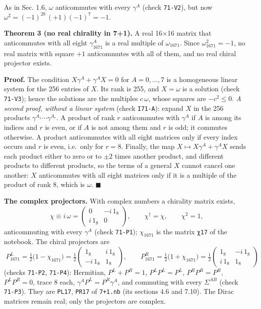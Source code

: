 \documentclass[
  10pt,
]{article}
\begin{document}
As in Sec. 1.6, \(\omega\) anticommutes with every \(\gamma^A\) (check
\texttt{71-V2}), but now \(\omega^2=(-1)^{28}\,(+1)(-1)^7=-1\).

\textbf{Theorem 3 (no real chirality in 7+1).} A real 16×16 matrix that
anticommutes with all eight \(\gamma_{1671}^A\) is a real multiple of
\(\omega_{1671}\). Since \(\omega_{1671}^2=-1\), no real matrix with
square \(+1\) anticommutes with all of them, and no real chiral
projector exists.

\textbf{Proof.} The condition \(X\gamma^A+\gamma^AX=0\) for
\(A=0,\dots,7\) is a homogeneous linear system for the 256 entries of
\(X\). Its rank is 255, and \(X=\omega\) is a solution (check
\texttt{71-V3}); hence the solutions are the multiples \(c\,\omega\),
whose squares are \(-c^2\le0\). \emph{A second proof, without a linear
system} (check \texttt{I71-A}): expand \(X\) in the 256 products
\(\gamma^{A_1}\cdots\gamma^{A_r}\). A product of rank \(r\) anticommutes
with \(\gamma^A\) if \(A\) is among its indices and \(r\) is even, or if
\(A\) is not among them and \(r\) is odd; it commutes otherwise. A
product anticommutes with all eight matrices only if every index occurs
and \(r\) is even, i.e.~only for \(r=8\). Finally, the map
\(X\mapsto X\gamma^A+\gamma^AX\) sends each product either to zero or to
\(\pm2\) times another product, and different products to different
products, so the terms of a general \(X\) cannot cancel one another:
\(X\) anticommutes with all eight matrices only if it is a multiple of
the product of rank 8, which is \(\omega\). \(\blacksquare\)

\textbf{The complex projectors.} With complex numbers a chirality matrix
exists,
\[\chi\equiv i\,\omega=\begin{pmatrix}0&-i\,1_8\\ i\,1_8&0\end{pmatrix},\qquad\chi^\dagger=\chi,\qquad\chi^2=1,\]
anticommuting with every \(\gamma^A\) (check \texttt{71-P1});
\(\chi_{1671}\) is the matrix \texttt{χ17} of the notebook. The chiral
projectors are
\[\boxed{\;P_{1671}^{L}=\tfrac12\big(1-\chi_{1671}\big)=\tfrac12\begin{pmatrix}1_8&i\,1_8\\-i\,1_8&1_8\end{pmatrix},\qquad
P_{1671}^{R}=\tfrac12\big(1+\chi_{1671}\big)=\tfrac12\begin{pmatrix}1_8&-i\,1_8\\ i\,1_8&1_8\end{pmatrix}\;}\tag{2.4}\]
(checks \texttt{71-P2}, \texttt{71-P4}): Hermitian, \(P^{L}+P^{R}=1\),
\(P^{L}P^{L}=P^{L}\), \(P^{R}P^{R}=P^{R}\), \(P^{L}P^{R}=0\), trace 8
each, \(\gamma^AP^{L}=P^{R}\gamma^A\), and commuting with every
\(\Sigma^{AB}\) (check \texttt{71-P3}). They are \texttt{PL17},
\texttt{PR17} of \texttt{7+1.nb} (its sections 4.6 and 7.10). The Dirac
matrices remain real; only the projectors are complex.
\end{document}

